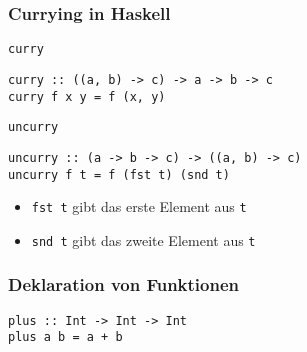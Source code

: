 \documentclass[fleqn,11pt,aspectratio=43]{beamer}
\begin{document}
\begin{frame}[fragile]
\frametitle{Currying in Haskell}
\begin{block}{\lstinline|curry|}
\begin{lstlisting}
curry :: ((a, b) -> c) -> a -> b -> c
curry f x y = f (x, y)
\end{lstlisting}
\end{block}
\pause
\begin{block}{\lstinline|uncurry|}
\begin{lstlisting}
uncurry :: (a -> b -> c) -> ((a, b) -> c)
uncurry f t = f (fst t) (snd t)
\end{lstlisting}
\end{block}
\pause
\vspace*{-3ex}
\begin{block}{\vspace*{-3ex}}
\begin{itemize}
  \item \lstinline|fst t| gibt das erste Element aus \lstinline|t|
  \item \lstinline|snd t| gibt das zweite Element aus \lstinline|t|
\end{itemize}
\end{block}
\end{frame}

\begin{frame}[fragile]
\frametitle{Deklaration von Funktionen} 	
\begin{lstlisting}
plus :: Int -> Int -> Int
plus a b = a + b
\end{lstlisting}
\end{frame}
\end{document}
